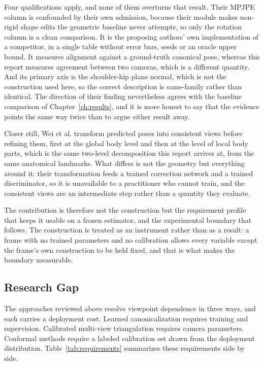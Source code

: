 \documentclass[12pt,a4paper]{report}
\begin{document}
Four qualifications apply, and none of them overturns that result. Their MPJPE
column is confounded by their own admission, because their module makes non-rigid
shape edits the geometric baseline never attempts, so only the rotation column is
a clean comparison. It is the proposing authors' own implementation of a
competitor, in a single table without error bars, seeds or an oracle upper bound.
It measures alignment against a ground-truth canonical pose, whereas this report
measures agreement between two cameras, which is a different quantity. And its
primary axis is the shoulder-hip plane normal, which is not the construction used
here, so the correct description is same-family rather than identical. The
direction of their finding nevertheless agrees with the baseline comparison of
Chapter~\ref{ch:results}, and it is more honest to say that the evidence points
the same way twice than to argue either result away.

Closer still, Wei et al. \cite{vihc} transform predicted poses into consistent views before
refining them, first at the global body level and then at the level of local body
parts, which is the same two-level decomposition this report arrives at, from the
same anatomical landmarks. What differs is not the geometry but everything around
it: their transformation feeds a trained correction network and a trained
discriminator, so it is unavailable to a practitioner who cannot train, and the
consistent views are an intermediate step rather than a quantity they evaluate.

The contribution is therefore not the construction but the requirement profile
that keeps it usable on a frozen estimator, and the experimental boundary that
follows. The construction is treated as an instrument rather than as a result: a
frame with no trained parameters and no calibration allows every variable except
the frame's own construction to be held fixed, and that is what makes the
boundary measurable.

\subsection{Research Gap}
\label{sec:gap}

The approaches reviewed above resolve viewpoint dependence in three ways, and each
carries a deployment cost. Learned canonicalization \cite{3dpcnet,3dpcnet2,vvipe,vihc}
requires training and supervision. Calibrated multi-view triangulation requires camera
parameters. Conformal methods \cite{yangpavone} require a labeled calibration set drawn
from the deployment distribution. Table~\ref{tab:requirements} summarizes these
requirements side by side.
\end{document}
